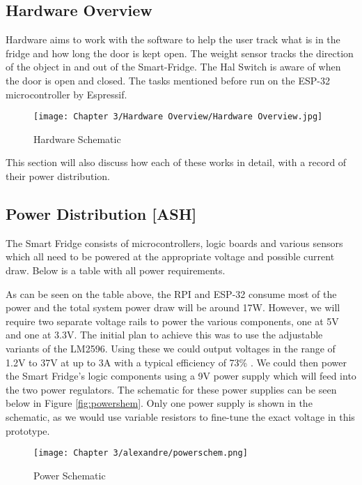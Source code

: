 \subsection{Hardware Overview}

Hardware aims to work with the software to help the user track what is in the fridge and how long the door is kept open.
The weight sensor tracks the direction of the object in and out of the Smart-Fridge.
The Hal Switch is aware of when the door is open and closed.
The tasks mentioned before run on the ESP-32 microcontroller by Espressif.


\begin{figure}[H]        
    \centering
    \texttt{[image: Chapter 3/Hardware Overview/Hardware Overview.jpg]}
    \caption{Hardware Schematic}
\end{figure} 

This section will also discuss how each of these works in detail, with a record of their power distribution.


\subsection{Power Distribution [ASH]}

The Smart Fridge consists of microcontrollers, logic boards and various sensors which all need to be powered at the appropriate voltage and possible current draw.
Below is a table with all power requirements.



As can be seen on the table above, the RPI and ESP-32 consume most of the power and the total system power draw will be around 17W.
However, we will require two separate voltage rails to power the various components, one at 5V and one at 3.3V.
The initial plan to achieve this was to use the adjustable variants of the LM2596.
Using these we could output voltages in the range of 1.2V to 37V at up to 3A with a typical efficiency of 73\% \cite{tidatasheet}.
We could then power the Smart Fridge's logic components using a 9V power supply which will feed into the two power regulators.
The schematic for these power supplies can be seen below in Figure \ref{fig:powershem}.
Only one power supply is shown in the schematic, as we would use variable resistors to fine-tune the exact voltage in this prototype.

\begin{figure}[H]        
    \centering
    \texttt{[image: Chapter 3/alexandre/powerschem.png]}
    \caption{Power Schematic}
    \label{fig:powerschem}
\end{figure} 

